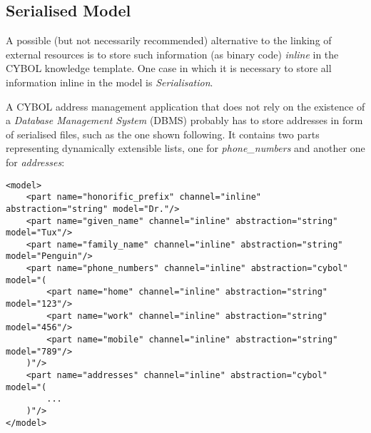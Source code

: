 %
%
%
%
%
%

\subsection{Serialised Model}
\label{serialised_model_heading}

A possible (but not necessarily recommended) alternative to the linking of
external resources is to store such information (as binary code) \emph{inline}
in the CYBOL knowledge template. One case in which it is necessary to store all
information inline in the model is \emph{Serialisation}.

A CYBOL address management application that does not rely on the existence of a
\emph{Database Management System} (DBMS) probably has to store addresses in
form of serialised files, such as the one shown following. It contains two
parts representing dynamically extensible lists, one for \emph{phone\_numbers}
and another one for \emph{addresses}:

\begin{scriptsize}
    \begin{verbatim}
<model>
    <part name="honorific_prefix" channel="inline" abstraction="string" model="Dr."/>
    <part name="given_name" channel="inline" abstraction="string" model="Tux"/>
    <part name="family_name" channel="inline" abstraction="string" model="Penguin"/>
    <part name="phone_numbers" channel="inline" abstraction="cybol" model="(
        <part name="home" channel="inline" abstraction="string" model="123"/>
        <part name="work" channel="inline" abstraction="string" model="456"/>
        <part name="mobile" channel="inline" abstraction="string" model="789"/>
    )"/>
    <part name="addresses" channel="inline" abstraction="cybol" model="(
        ...
    )"/>
</model>
    \end{verbatim}
\end{scriptsize}

